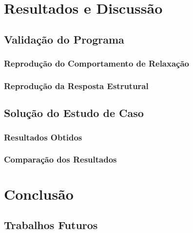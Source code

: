 \documentclass[arial,centeredequations,english,brazilian,oneside,section=TITLE]{ifes8}
\begin{document}
\chapter{Resultados e Discussão}
\label{sec:resultados-e-discussao}

\section{Validação do Programa}
\label{sec:validacao-programa}

\subsection{Reprodução do Comportamento de Relaxação}
\label{sec:reproducao-relaxacao}

\subsection{Reprodução da Resposta Estrutural}
\label{sec:reproducao-solucao-estrutural}

\section{Solução do Estudo de Caso}
\label{sec:solucao-do-estudo-de-caso}

\subsection{Resultados Obtidos}
\label{sec:resultados-obtidos}

\subsection{Comparação dos Resultados}
\label{sec:comparacao-resultados}


\chapter{Conclusão}
\label{sec:conclusao}

\section{Trabalhos Futuros}
\label{sec:trabalhos-futuros}
\end{document}
